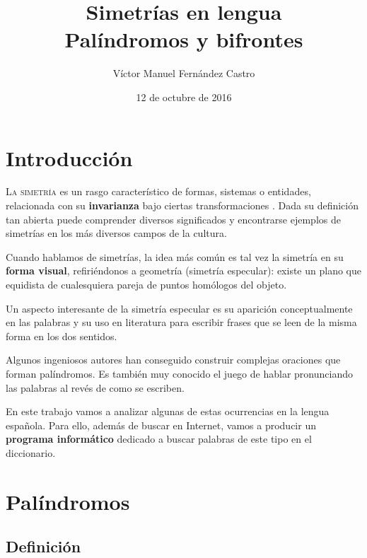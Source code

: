 \documentclass[10pt,a4paper]{article}
\author{Víctor Manuel Fernández Castro}
\title{Simetrías en lengua \\ \Large Palíndromos y bifrontes}
\date{12 de octubre de 2016}
\begin{document}
	\maketitle
	\thispagestyle{empty}
	
	\newpage
	\setcounter{page}{1}
	\tableofcontents
	
	
	\newpage
	\pagestyle{fancy}
	\section{Introducción}
	
	\lettrine{L}{a simetría} es un rasgo característico de formas, sistemas o entidades, relacionada con su \textbf{invarianza} bajo ciertas transformaciones \cite{simetria}. Dada su definición tan abierta puede comprender diversos significados y encontrarse ejemplos de simetrías en los más diversos campos de la cultura.
	
	Cuando hablamos de simetrías, la idea más común es tal vez la simetría en su \textbf{forma visual}, refiriéndonos a geometría (simetría especular): existe un plano que equidista de cualesquiera pareja de puntos homólogos del objeto. \cite{simetria_especular}
	
	Un aspecto interesante de la simetría especular es su aparición conceptualmente en las palabras y su uso en literatura para escribir frases que se leen de la misma forma en los dos sentidos.
	
	Algunos ingeniosos autores han conseguido construir complejas oraciones que forman palíndromos. Es también muy conocido el juego de hablar pronunciando las palabras al revés de como se escriben.
	
	En este trabajo vamos a analizar algunas de estas ocurrencias en la lengua española. Para ello, además de buscar en Internet, vamos a producir un \textbf{programa informático} dedicado a buscar palabras de este tipo en el diccionario.
	
	
	\section{Palíndromos}
	\subsection{Definición}
	
\end{document}
